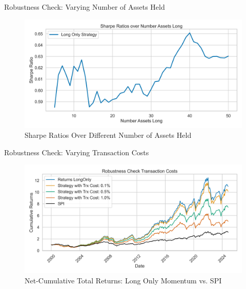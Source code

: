 \documentclass[10pt]{beamer}
\begin{document}
\begin{frame}{Robustness Check: Varying Number of Assets Held}
  \begin{figure}
   \caption{Sharpe Ratios Over Different Number of Assets Held}
        \centering
        \includegraphics[width=\linewidth]{figures/rc_number_assets.png}
    \end{figure}
\end{frame}

\begin{frame}{Robustness Check: Varying Transaction Costs}
  \begin{figure}
   \caption{Net-Cumulative Total Returns: Long Only Momentum vs. SPI}
        \centering
        \includegraphics[width=\linewidth]{figures/rc_trxCost.png}
    \end{figure}
\end{frame}

\end{document}
